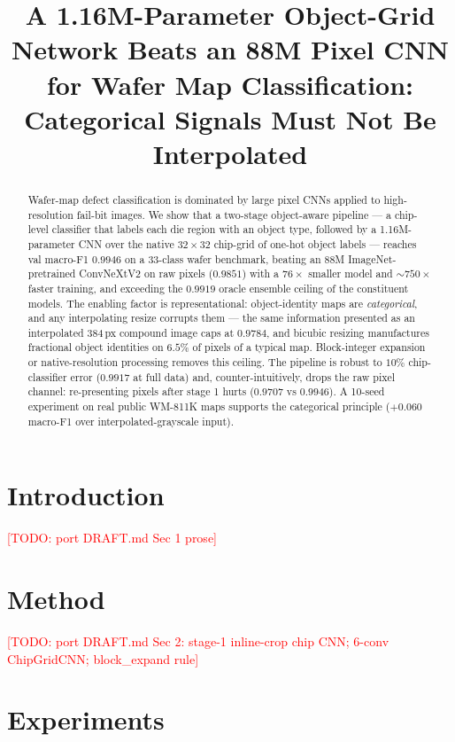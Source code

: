 \documentclass[11pt]{article}
\title{A 1.16M-Parameter Object-Grid Network Beats an 88M Pixel CNN for
Wafer Map Classification:\\ Categorical Signals Must Not Be Interpolated}
\author{\todo{authors}}
\date{}
\newcommand{\todo}[1]{\textcolor{red}{[TODO: #1]}}
\begin{document}
\maketitle

\begin{abstract}
Wafer-map defect classification is dominated by large pixel CNNs applied
to high-resolution fail-bit images. We show that a two-stage object-aware
pipeline --- a chip-level classifier that labels each die region with an
object type, followed by a 1.16M-parameter CNN over the native
$32{\times}32$ chip-grid of one-hot object labels --- reaches val macro-F1
$0.9946$ on a 33-class wafer benchmark, beating an 88M ImageNet-pretrained
ConvNeXtV2 on raw pixels ($0.9851$) with a $76\times$ smaller model and
${\sim}750\times$ faster training, and exceeding the $0.9919$ oracle
ensemble ceiling of the constituent models. The enabling factor is
representational: object-identity maps are \emph{categorical}, and any
interpolating resize corrupts them --- the same information presented as
an interpolated 384\,px compound image caps at $0.9784$, and bicubic
resizing manufactures fractional object identities on $6.5\%$ of pixels of
a typical map. Block-integer expansion or native-resolution processing
removes this ceiling. The pipeline is robust to $10\%$ chip-classifier
error ($0.9917$ at full data) and, counter-intuitively, drops the raw
pixel channel: re-presenting pixels after stage 1 hurts ($0.9707$ vs
$0.9946$). A 10-seed experiment on real public WM-811K maps supports the
categorical principle ($+0.060$ macro-F1 over interpolated-grayscale
input).
\end{abstract}

\section{Introduction}\label{sec:intro}
\todo{port DRAFT.md Sec 1 prose}

\section{Method}\label{sec:method}
\todo{port DRAFT.md Sec 2: stage-1 inline-crop chip CNN; 6-conv ChipGridCNN;
block\_expand rule}

\section{Experiments}\label{sec:experiments}
\end{document}

